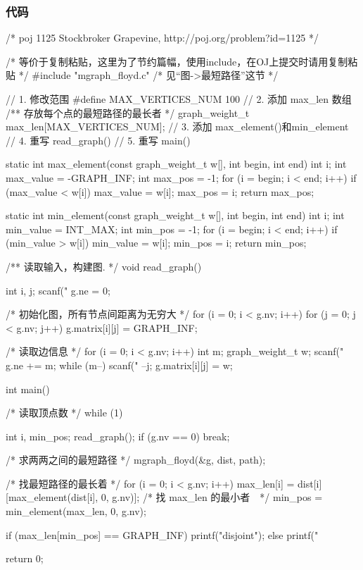 \subsubsection{代码}
\begin{Codex}[label=poj_1125.c]
/* poj 1125 Stockbroker Grapevine, http://poj.org/problem?id=1125 */

/* 等价于复制粘贴，这里为了节约篇幅，使用include，在OJ上提交时请用复制粘贴 */
#include "mgraph_floyd.c"  /* 见“图->最短路径”这节 */

// 1. 修改范围
#define MAX_VERTICES_NUM 100
// 2. 添加 max_len 数组
/** 存放每个点的最短路径的最长者 */
graph_weight_t max_len[MAX_VERTICES_NUM];
// 3. 添加 max_element()和min_element
// 4. 重写 read_graph()
// 5. 重写 main()

static int max_element(const graph_weight_t w[], int begin, int end) {
    int i;
    int max_value = -GRAPH_INF;
    int max_pos = -1;
    for (i = begin; i < end; i++) {
        if (max_value < w[i]) {
            max_value = w[i];
            max_pos = i;
        }
    }
    return max_pos;
}

static int min_element(const graph_weight_t w[], int begin, int end) {
    int i;
    int min_value = INT_MAX;
    int min_pos = -1;
    for (i = begin; i < end; i++) {
        if (min_value > w[i]) {
            min_value = w[i];
            min_pos = i;
        }
    }
    return min_pos;
}


/** 读取输入，构建图. */
void read_graph() {
    int i, j;
    scanf("%
    g.ne = 0;

    /* 初始化图，所有节点间距离为无穷大 */
    for (i = 0; i < g.nv; i++) {
        for (j = 0; j < g.nv; j++) {
            g.matrix[i][j] = GRAPH_INF;
        }
    }

    /* 读取边信息 */
    for (i = 0; i < g.nv; i++) {
        int m;
        graph_weight_t w;
        scanf("%
        g.ne += m;
        while (m--) {
            scanf("%
            --j;
            g.matrix[i][j] = w;
        }
    }
}

int main() {
    /* 读取顶点数 */
    while (1) {
        int i, min_pos;
        read_graph();
        if (g.nv == 0)
            break;

        /* 求两两之间的最短路径 */
        mgraph_floyd(&g, dist, path);

        /* 找最短路径的最长着 */
        for (i = 0; i < g.nv; i++) {
            max_len[i] = dist[i][max_element(dist[i], 0, g.nv)];
        }
        /* 找 max_len 的最小者　*/
        min_pos = min_element(max_len, 0, g.nv);

        if (max_len[min_pos] == GRAPH_INF) {
            printf("disjoint\n");
        } else {
            printf("%
        }
    }
    return 0;
}
\end{Codex}

